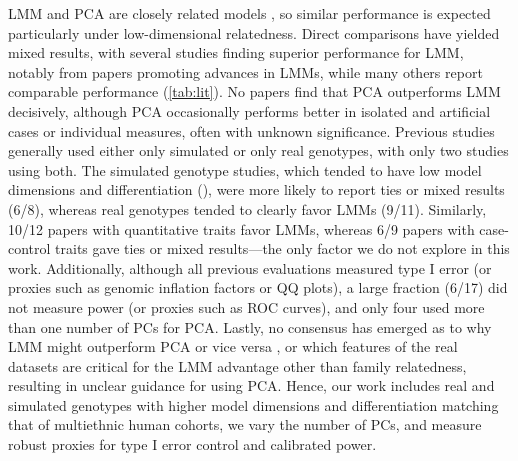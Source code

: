 \documentclass[11pt]{article}
\begin{document}
\begin{linenumbers}
LMM and PCA are closely related models \citep{astle_population_2009, janss_inferences_2012, hoffman_correcting_2013, zhang_principal_2015}, so similar performance is expected particularly under low-dimensional relatedness.
Direct comparisons have yielded mixed results, with several studies finding superior performance for LMM, notably from papers promoting advances in LMMs, while many others report comparable performance (\cref{tab:lit}).
No papers find that PCA outperforms LMM decisively, although PCA occasionally performs better in isolated and artificial cases or individual measures, often with unknown significance.
Previous studies generally used either only simulated or only real genotypes, with only two studies using both.
The simulated genotype studies, which tended to have low model dimensions and differentiation (\Fst), were more likely to report ties or mixed results (6/8), whereas real genotypes tended to clearly favor LMMs (9/11).
Similarly, 10/12 papers with quantitative traits favor LMMs, whereas 6/9 papers with case-control traits gave ties or mixed results---the only factor we do not explore in this work.
Additionally, although all previous evaluations measured type I error (or proxies such as genomic inflation factors \citep{devlin_genomic_1999} or QQ plots), a large fraction (6/17) did not measure power (or proxies such as ROC curves), and only four used more than one number of PCs for PCA.
Lastly, no consensus has emerged as to why LMM might outperform PCA or vice versa \citep{price_new_2010, sul_mixed_2013, price_response_2013, hoffman_correcting_2013}, or which features of the real datasets are critical for the LMM advantage other than family relatedness, resulting in unclear guidance for using PCA.
Hence, our work includes real and simulated genotypes with higher model dimensions and differentiation matching that of multiethnic human cohorts, we vary the number of PCs, and measure robust proxies for type I error control and calibrated power.


\end{linenumbers}
\end{document}
